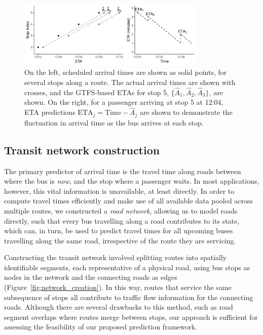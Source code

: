 \begin{figure}[tb]
    \centering
    \includegraphics[width=0.8\textwidth]{figures/02_gtfs_delays.pdf}
    \caption{
        On the left, scheduled arrival times are shown as solid points,
        for several stops along a route. The actual arrival times
        are shown with crosses,
        and the GTFS-based ETAs for stop 5, $\{\hat A_1, \hat A_2, \hat A_3\}$, are shown.
        On the right,
        for a passenger arriving at stop 5 at 12:04,
        ETA predictions
        $\mathrm{ETA}_j = \mathrm{Time} - \hat A_j$ are shown
        to demonstrate the fluctuation in
        arrival time as the bus arrives at each stop.
    }
    \label{fig:gtfs-delays}
\end{figure}



\subsection{Transit network construction}
\label{sec:network_build}

The primary predictor of arrival time is
the travel time along roads between where the bus is \emph{now},
and the stop where a passenger waits.
In most applications, however, this vital information is unavailable, at least directly.
In order to compute travel times efficiently
and make use of all available data pooled across multiple routes,
we constructed a \emph{road network},
allowing us to model roads directly,
such that every bus travelling along a road contributes to its state,
which can, in turn, be used to predict travel times for all upcoming buses
travelling along the same road,
irrespective of the route they are servicing.


Constructing the transit network involved splitting routes
into spatially identifiable segments,
each representative of a physical road,
using bus stops as nodes in the network
and the connecting roads as edges
(Figure~\ref{fig:network_creation}).
In this way, routes that service the same subsequence of stops
all contribute to traffic flow information for the connecting roads.
Although there are several drawbacks to this method,
such as road segment overlaps where routes merge between stops,
our approach is sufficient for assessing the \rt
feasibility of our proposed prediction framework.



